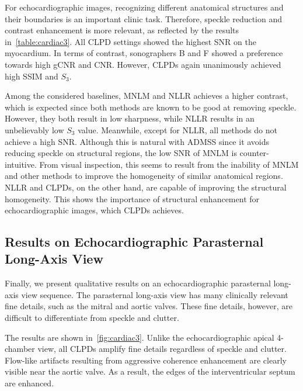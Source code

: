 For echocardiographic images, recognizing different anatomical structures and their boundaries is an important clinic task.
Therefore, speckle reduction and contrast enhancement is more relevant, as reflected by the results in~\cref{table:cardiac3}.
All CLPD settings showed the highest SNR on the myocardium.
In terms of contrast, sonographers B and F showed a preference towards high gCNR and CNR.
However, CLPDs again unanimously achieved high SSIM and \(S_3\).

Among the considered baselines, MNLM and NLLR achieves a higher contrast, which is expected since both methods are known to be good at removing speckle.
However, they both result in low sharpness, while NLLR results in an unbelievably low \(S_3\) value.
Meanwhile, except for NLLR, all methods do not achieve a high SNR.
Although this is natural with ADMSS since it avoids reducing speckle on structural regions, the low SNR of MNLM is counter-intuitive.
From visual inspection, this seems to result from the inability of MNLM and other methods to improve the homogeneity of similar anatomical regions.
NLLR and CLPDs, on the other hand, are capable of improving the structural homogeneity.
This shows the importance of structural enhancement for echocardiographic images, which CLPDs achieves.

\subsection{Results on Echocardiographic Parasternal Long-Axis View}
Finally, we present qualitative results on an echocardiographic parasternal long-axis view sequence.
The parasternal long-axis view has many clinically relevant fine details, such as the mitral and aortic valves.
These fine details, however, are difficult to differentiate from speckle and clutter.

The results are shown in~\cref{fig:cardiac3}.
Unlike the echocardiographic apical 4-chamber view, all CLPDs amplify fine details regardless of speckle and clutter.
Flow-like artifacts resulting from aggressive coherence enhancement are clearly visible near the aortic valve.
As a result, the edges of the interventricular septum are enhanced.

